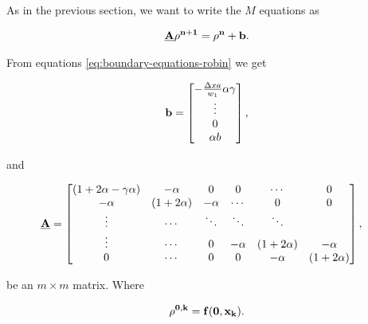 As in the previous section, we want to write the $M$ equations as 

\begin{align}
    \bf{\underline{A}} \bf{\rho^{n+1}}  = \bf{\rho^n} + \bf{b}.
\end{align}

From equations \ref{eq:boundary-equations-robin} we get

\begin{align}
    \bf{b} = \begin{bmatrix}
                    -\frac{\Delta x a }{w_1}\alpha\gamma\\
                    \vdots \\
                    0 \\
                    \alpha b 
                    \end{bmatrix},
\end{align}


and 

\begin{align}
\bf{\underline{A}} &= \begin{bmatrix}
           ( 1 + 2\alpha-\gamma\alpha) & -\alpha  &  0 & 0 &  \cdots & 0\\
             -\alpha & ( 1 + 2 \alpha ) & -\alpha & \cdots & 0 & 0\\
           \vdots  &\cdots  & \ddots & \ddots &  \ddots&  \\
            \vdots & \cdots & 0  &  -\alpha & ( 1 + 2 \alpha ) & -\alpha \\
            0 & \cdots &0  & 0 & -\alpha & ( 1 + 2 \alpha )
         \end{bmatrix}
         \label{eq:discretization-matrix-with-bc},
\end{align}

be an $m\times m$ matrix. Where

\begin{align}
    \bf{\rho^{0,k}} = f(0, x_k). \\
\end{align}







